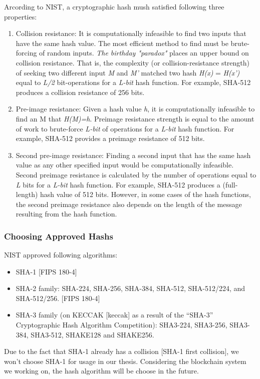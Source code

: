 Arcording to NIST, a cryptographic hash mush satisfied following three properties:
\begin{enumerate}
	\item Collision resistance: It is computationally infeasible to find two inputs that have the same hash value.
	      The most efficient method to find must be brute-forcing of random inputs.
	      \emph{The birthday "paradox"} places an upper bound on collision resistance.
	      That is, the complexity (or collision-resistance strength) of seeking two different input \emph{M} and \emph{M'} matched two hash \emph{H(x)} = \emph{H(x’)} equal to \emph{L/2} bit-operations for a \emph{L-bit} hash function.
	      For example, SHA-512 produces a collision resistance of 256 bits.

	\item Pre-image resistance: Given a hash value \emph{h}, it is computationally infeasible to find an M that \emph{H(M)=h}.
	      Preimage resistance strength is equal to the amount of work to brute-force \emph{L-bit} of operations for a \emph{L-bit} hash function.
	      For example, SHA-512 provides a preimage resistance of 512 bits.

	\item Second pre-image resistance: Finding a second input that has the same hash value as any other specified input would be computationally infeasible.
	      Second preimage resistance is calculated by the number of operations equal to  \emph{L} bits for a \emph{L-bit} hash function.
	      For example, SHA-512 produces a (full-length) hash value of 512 bits.
	      However, in some cases of the hash functions, the second preimage resistance also depends on the length of the message resulting from the hash function.

\end{enumerate}

\subsubsection{Choosing Approved Hashs}
NIST approved following algorithms:
\begin{itemize}
	\item SHA-1 [FIPS 180-4]

	\item SHA-2 family: SHA-224, SHA-256, SHA-384, SHA-512, SHA-512/224, and SHA-512/256. [FIPS 180-4]

	\item SHA-3 family (on KECCAK [keccak] as a result of the “SHA-3” Cryptographic Hash Algorithm Competition):  SHA3-224, SHA3-256, SHA3-384, SHA3-512, SHAKE128 and SHAKE256.
\end{itemize}
Due to the fact that SHA-1 already has a collision [SHA-1 first collision], we won't choose SHA-1 for usage in our thesis.
Considering the blockchain system we working on, the hash algorithm will be choose in the future.

